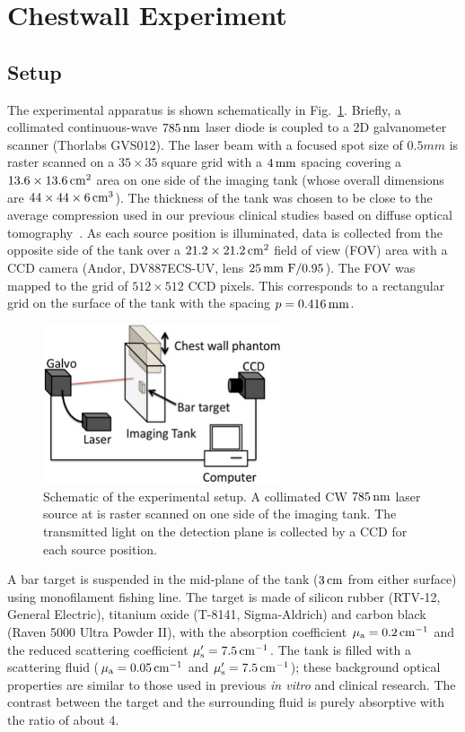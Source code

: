 \section{Chestwall Experiment}
\subsection{Setup}
\label{sec:exp}

The experimental apparatus is shown schematically in Fig.~\ref{fig:schem}.  Briefly, a collimated continuous-wave $785\,{\rm nm}$ laser diode is coupled to a 2D galvanometer scanner (Thorlabs GVS012). The laser beam with a focused spot   size of $0.5 mm$ is raster scanned on a $35\times 35$ square grid
with a $4\,{\rm mm}$ spacing covering a $13.6\times 13.6\,{\rm cm}^2$ area on one side of the imaging tank (whose overall dimensions are $44\times 44\times 6\,{\rm cm}^3$). The thickness of the tank was chosen to be close to the average compression used in our previous clinical studies based on diffuse optical tomography~\cite{choe_09_1, culver_03_1}. As each source position is illuminated, data is collected from the opposite side of the tank over
a $21.2\times 21.2\,{\rm cm}^2$ field of view (FOV) area with a CCD camera (Andor, DV887ECS-UV, lens $25\,{\rm mm}\ {\rm F}/0.95$). The FOV was mapped to the grid of $512\times 512$ CCD pixels. This corresponds to a rectangular grid on the surface of the tank with the spacing $p=0.416\,{\rm mm}$.

\begin{figure}[t]
\centering\includegraphics[width=7cm]{./figures/chestwall_1.pdf}
\caption{\label{fig:schem}
  Schematic of the experimental setup. A collimated CW $785\,{\rm nm}$
  laser source at is raster scanned on one side of the imaging tank.
  The transmitted light on the detection plane is collected by a CCD
  for each source position.}
\end{figure}

A bar target is suspended in the mid-plane of the tank ($3\,{\rm cm}$ from either surface) using monofilament fishing line. The target is made of silicon rubber (RTV-12, General Electric), titanium oxide (T-8141, Sigma-Aldrich) and carbon black (Raven 5000 Ultra Powder II), with the absorption coefficient $\mu_{\rm a}=0.2\,{\rm cm}^{-1}$ and the reduced scattering coefficient $\mu_{\rm s}^\prime = 7.5\,{\rm cm}^{-1}$.  The tank is filled with a scattering fluid ($\mu_{\rm a} = 0.05\,{\rm cm}^{-1}$ and $\mu_{\rm s}^\prime = 7.5\,{\rm cm}^{-1}$); these background optical properties are similar to those used in previous {\em in vitro} and clinical research. The contrast between the target and the surrounding fluid is purely absorptive with the ratio of about 4.

